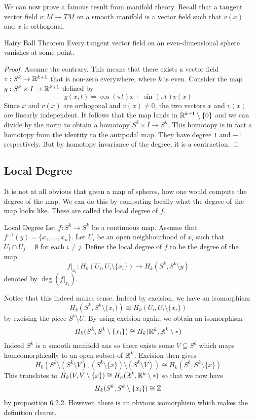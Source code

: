 \documentclass[a4paper]{article}
\begin{document}
We can now prove a famous result from manifold theory. Recall that a tangent vector field $v:M\to TM$ on a smooth manifold is a vector field such that $v(x)$ and $x$ is orthogonal. 

\begin{thm}{Hairy Ball Theorem}{} Every tangent vector field on an even-dimensional sphere vanishes at some point. \tcbline
\begin{proof}
Assume the contrary. This means that there exists a vector field $v:S^k\to\mathbb{R}^{k+1}$ that is non-zero everywhere, where $k$ is even. Consider the map $g:S^k\times I\to\mathbb{R}^{k+1}$ defined by $$g(x,t)=\cos(\pi t)x+\sin(\pi t)v(x)$$ Since $x$ and $v(x)$ are orthogonal and $v(x)\neq 0$, the two vectors $x$ and $v(x)$ are linearly independent. It follows that the map lands in $\mathbb{R}^{k+1}\setminus\{0\}$ and we can divide by the norm to obtain a homotopy $S^k\times I\to S^k$. This homotopy is in fact a homotopy from the identity to the antipodal map. They have degree $1$ and $-1$ respectively. But by homotopy invariance of the degree, it is a contraction. 
\end{proof}
\end{thm}

\subsection{Local Degree}
It is not at all obvious that given a map of spheres, how one would compute the degree of the map. We can do this by computing locally what the degree of the map looks like. These are called the local degree of $f$. 

\begin{defn}{Local Degree}{} Let $f:S^k\to S^k$ be a continuous map. Assume that $f^{-1}(y)=\{x_1,\dots,x_n\}$. Let $U_i$ be an open neighbourhood of $x_i$ such that $U_i\cap U_j=\emptyset$ for each $i\neq j$. Define the local degree of $f$ to be the degree of the map $$f|_{x_i}:H_k(U_i,U_i\setminus\{x_i\})\to H_k(S^k,S^k\setminus{y})$$ denoted by $\deg(f|_{x_i})$. 
\end{defn}

Notice that this indeed makes sense. Indeed by excision, we have an isomorphism $$H_k(S^k,S^k\setminus\{x_i\})\cong H_k(U_i,U_i\setminus\{x_i\})$$ by excising the piece $S^k\setminus U$. By using excision again, we obtain an isomorphism $$H_k(S^k,S^k\setminus\{x_i\})\cong H_k(\mathbb{R}^k,\mathbb{R}^k\setminus\ast)$$ Indeed $S^k$ is a smooth manifold ans so there exists some $V\subseteq S^k$ which maps homeomorphically to an open subset of $\mathbb{R}^k$. Excision then gives $$H_k\left(S^k\setminus(S^k\setminus V),(S^k\setminus\{x\})\setminus(S^k\setminus V)\right)\cong H_k(S^k,S^k\setminus\{x\})$$ This translates to $H_k(V,V\setminus\{x\})\cong H_n(\mathbb{R}^k,\mathbb{R}^k\setminus\ast)$ so that we now have $$H_k(S^k,S^k\setminus\{x_i\})\cong\mathbb{Z}$$ by proposition 6.2.2. However, there is an obvious isomorphism which makes the definition clearer. 
\end{document}
